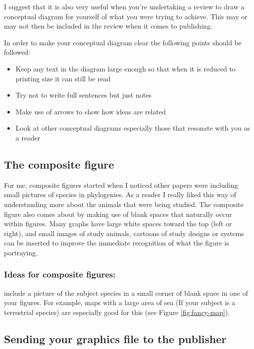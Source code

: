 \documentclass[
]{krantz}
\providecommand{\tightlist}{%
  \setlength{\itemsep}{0pt}\setlength{\parskip}{0pt}}
\begin{document}
I suggest that it is also very useful when you're undertaking a review to draw a conceptual diagram for yourself of what you were trying to achieve. This may or may not then be included in the review when it comes to publishing.

In order to make your conceptual diagram clear the following points should be followed:

\begin{itemize}
\tightlist
\item
  Keep any text in the diagram large enough so that when it is reduced to printing size it can still be read
\item
  Try not to write full sentences but just notes
\item
  Make use of arrows to show how ideas are related
\item
  Look at other conceptual diagrams especially those that resonate with you as a reader
\end{itemize}

\hypertarget{the-composite-figure}{%
\subsection{The composite figure}\label{the-composite-figure}}

For me, composite figures started when I noticed other papers were including small pictures of species in phylogenies. As a reader I really liked this way of understanding more about the animals that were being studied. The composite figure also comes about by making use of blank spaces that naturally occur within figures. Many graphs have large white spaces toward the top (left or right), and small images of study animals, cartoons of study designs or systems can be inserted to improve the immediate recognition of what the figure is portraying.

\hypertarget{ideas-for-composite-figures}{%
\subsubsection{Ideas for composite figures:}\label{ideas-for-composite-figures}}

include a picture of the subject species in a small corner of blank space in one of your figures. For example, maps with a large area of sea (If your subject is a terrestrial species) are especially good for this (see Figure \ref{fig:fancy-map}).

\hypertarget{sending-your-graphics-file-to-the-publisher}{%
\subsection{Sending your graphics file to the publisher}\label{sending-your-graphics-file-to-the-publisher}}
\end{document}
